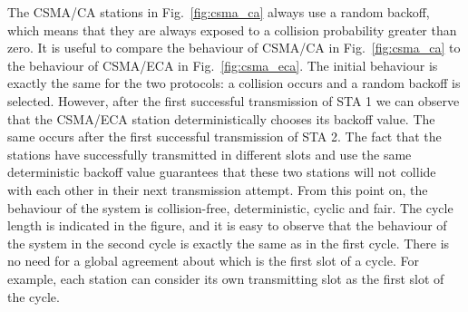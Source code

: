 \documentclass[journal]{IEEEtran}
\begin{document}
The CSMA/CA stations in Fig.~\ref{fig:csma_ca} always use a random backoff, which means that they are always exposed to a collision probability greater than zero.
%
It is useful to compare the behaviour of CSMA/CA in Fig.~\ref{fig:csma_ca} to the behaviour of CSMA/ECA in Fig.~\ref{fig:csma_eca}.
The initial behaviour is exactly the same for the two protocols: a collision occurs and a random backoff is selected.
However, after the first successful transmission of STA 1 we can observe that the CSMA/ECA station deterministically chooses its backoff value.
The same occurs after the first successful transmission of STA 2.
The fact that the stations have successfully transmitted in different slots and use the same deterministic backoff value guarantees that these two stations will not collide with each other in their next transmission attempt.
From this point on, the behaviour of the system is collision-free, deterministic, cyclic and fair.
The cycle length is indicated in the figure, and it is easy to observe that the behaviour of the system in the second cycle is exactly the same as in the first cycle.
There is no need for a global agreement about which is the first slot of a cycle.
For example, each station can consider its own transmitting slot as the first slot of the cycle.
\end{document}
